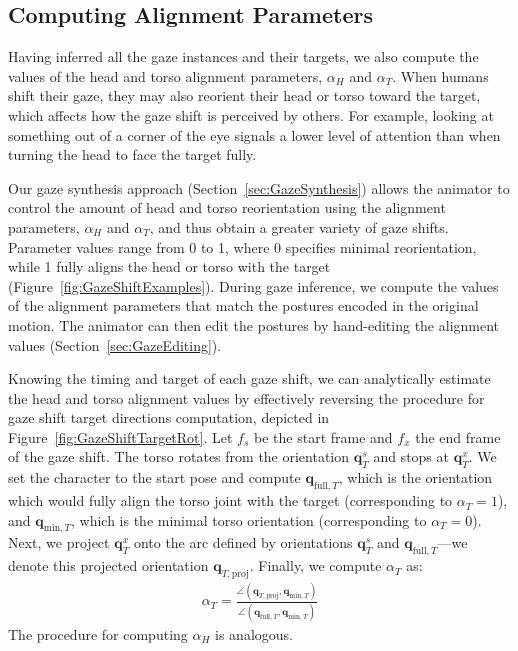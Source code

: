 \subsection{Computing Alignment Parameters}
\label{sec:GazeAlignmentInference}

Having inferred all the gaze instances and their targets, we also compute the values of the head and torso alignment parameters, $\alpha_{H}$ and $\alpha_{T}$. When humans shift their gaze, they may also reorient their head or torso toward the target, which affects how the gaze shift is perceived by others. For example, looking at something out of a corner of the eye signals a lower level of attention than when turning the head to face the target fully.

Our gaze synthesis approach (Section~\ref{sec:GazeSynthesis}) allows the animator to control the amount of head and torso reorientation using the alignment parameters, $\alpha_{H}$ and $\alpha_{T}$, and thus obtain a greater variety of gaze shifts. Parameter values range from 0 to 1, where 0 specifies minimal reorientation, while 1 fully aligns the head or torso with the target (Figure~\ref{fig:GazeShiftExamples}). During gaze inference, we compute the values of the alignment parameters that match the postures encoded in the original motion. The animator can then edit the postures by hand-editing the alignment values (Section~\ref{sec:GazeEditing}).

Knowing the timing and target of each gaze shift, we can analytically estimate the head and torso alignment values by effectively reversing the procedure for gaze shift target directions computation, depicted in Figure~\ref{fig:GazeShiftTargetRot}. Let $f_s$ be the start frame and $f_x$ the end frame of the gaze shift. The torso rotates from the orientation $\mathbf{q}_T^s$ and stops at $\mathbf{q}_T^x$. We set the character to the start pose and compute $\mathbf{q}_{\mathrm{full},T}$, which is the orientation which would fully align the torso joint with the target (corresponding to $\alpha_T = 1$), and $\mathbf{q}_{\mathrm{min},T}$, which is the minimal torso orientation (corresponding to $\alpha_{T} = 0$). Next, we project $\mathbf{q}_{T}^x$ onto the arc defined by orientations $\mathbf{q}_{T}^s$ and $\mathbf{q}_{\mathrm{full},T}$---we denote this projected orientation $\mathbf{q}_{T,\mathrm{proj}}$. Finally, we compute $\alpha_T$ as:
%
\begin{align} \label{eq:GazeAlignmentInference}
\alpha_T = \frac{\angle(\mathbf{q}_{T,\mathrm{proj}}, \mathbf{q}_{\mathrm{min},T})}{\angle(\mathbf{q}_{\mathrm{full},T}, \mathbf{q}_{\mathrm{min},T})}
\end{align}
%
The procedure for computing $\alpha_{H}$ is analogous.

